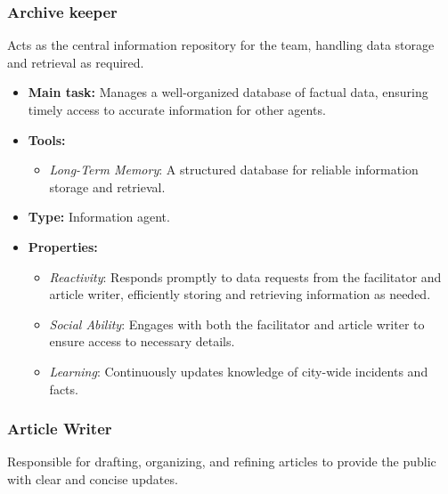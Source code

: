 \subsubsection{Archive keeper}

Acts as the central information repository for the team, handling data storage and retrieval as required.

\begin{itemize}
    \item \textbf{Main task:} Manages a well-organized database of factual data, ensuring timely access to accurate information for other agents.
    \item \textbf{Tools:}
    \begin{itemize}
        \item \emph{Long-Term Memory}: A structured database for reliable information storage and retrieval.
    \end{itemize}
    \item \textbf{Type:} Information agent.
    \item \textbf{Properties:}
    \begin{itemize}
        \item \emph{Reactivity}: Responds promptly to data requests from the facilitator and article writer, efficiently storing and retrieving information as needed.
        \item \emph{Social Ability}: Engages with both the facilitator and article writer to ensure access to necessary details.
        \item \emph{Learning}: Continuously updates knowledge of city-wide incidents and facts.
    \end{itemize}
\end{itemize}

\subsubsection{Article Writer}

Responsible for drafting, organizing, and refining articles to provide the public with clear and concise updates.

